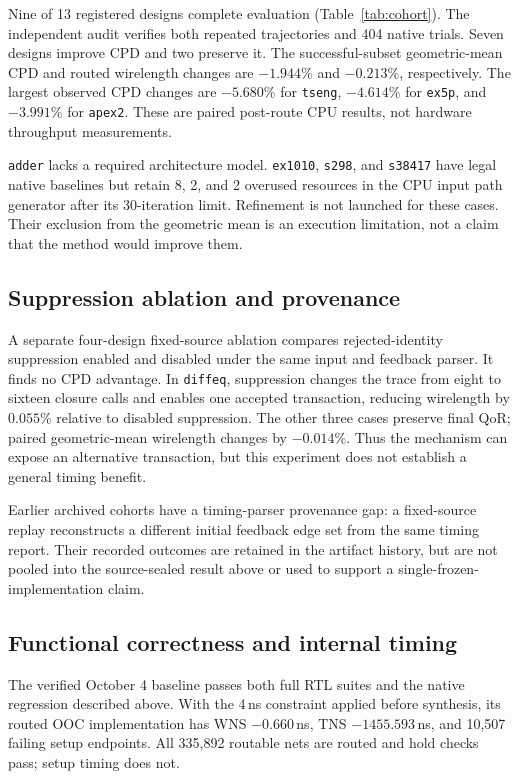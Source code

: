 \documentclass[conference,10pt]{IEEEtran}
\begin{document}
Nine of 13 registered designs complete evaluation (Table~\ref{tab:cohort}).
The independent audit verifies both repeated trajectories and 404 native
trials. Seven designs improve CPD and two preserve it. The successful-subset
geometric-mean CPD and routed wirelength changes are $-1.944\%$ and
$-0.213\%$, respectively. The largest observed CPD changes are
$-5.680\%$ for \texttt{tseng}, $-4.614\%$ for \texttt{ex5p}, and
$-3.991\%$ for \texttt{apex2}. These are paired post-route CPU results, not
hardware throughput measurements.

\texttt{adder} lacks a required architecture model. \texttt{ex1010},
\texttt{s298}, and \texttt{s38417} have legal native baselines but retain
8, 2, and 2 overused resources in the CPU input path generator after its
30-iteration limit. Refinement is not launched for these cases. Their
exclusion from the geometric mean is an execution limitation, not a claim
that the method would improve them.

\subsection{Suppression ablation and provenance}

A separate four-design fixed-source ablation compares rejected-identity
suppression enabled and disabled under the same input and feedback parser.
It finds no CPD advantage. In \texttt{diffeq}, suppression changes the trace
from eight to sixteen closure calls and enables one accepted transaction,
reducing wirelength by $0.055\%$ relative to disabled suppression. The other
three cases preserve final QoR; paired geometric-mean wirelength changes by
$-0.014\%$. Thus the mechanism can expose an alternative transaction, but
this experiment does not establish a general timing benefit.

Earlier archived cohorts have a timing-parser provenance gap: a fixed-source
replay reconstructs a different initial feedback edge set from the same
timing report. Their recorded outcomes are retained in the artifact history,
but are not pooled into the source-sealed result above or used to support
a single-frozen-implementation claim.

\subsection{Functional correctness and internal timing}

The verified October 4 baseline passes both full RTL suites and the native
regression described above. With the 4\,ns constraint applied before
synthesis, its routed OOC implementation has WNS $-0.660$\,ns, TNS
$-1455.593$\,ns, and 10,507 failing setup endpoints. All 335,892 routable
nets are routed and hold checks pass; setup timing does not.
\end{document}
